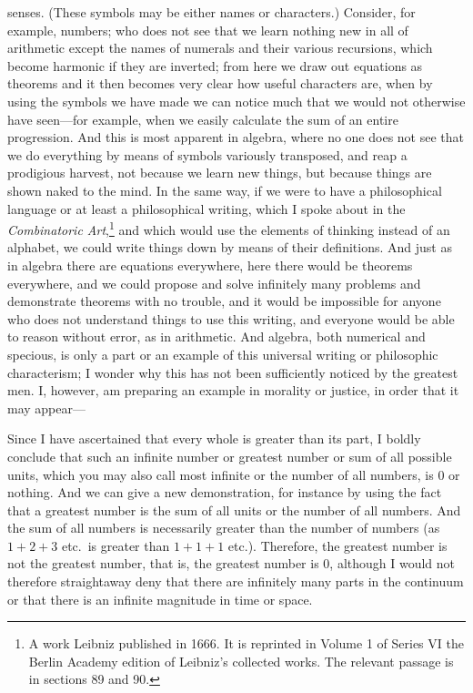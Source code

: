 \documentclass[polutonikogreek,english,twoside,openright]{article}
\begin{document}
senses. (These symbols may be either names or characters.) Consider, for
example, numbers; who does not see that we learn nothing new in all of
arithmetic except the names of numerals and their various recursions, which
become harmonic if they are inverted; from here we draw out equations as
theorems and it then becomes very clear how useful characters are, when by
using the symbols we have made we can notice much that we would not otherwise
have seen---for example, when we easily calculate the sum of an entire
progression.  And this is most apparent in algebra, where no one does not see
that we do everything by means of symbols variously transposed, and reap a
prodigious harvest, not because we learn new things, but because things are
shown naked to the mind.  In the same way, if we were to have a philosophical
language or at least a philosophical writing, which I spoke about in the {\em
Combinatoric Art},\footnote{A work Leibniz published in 1666.  It is reprinted in Volume 1 of Series VI the Berlin Academy edition of Leibniz's collected works.  The relevant passage is in sections 89 and 90. } and which would use the
elements of thinking instead of an alphabet, we could write things down by
means of their definitions.  And just as in algebra there are equations
everywhere, here there would be theorems everywhere, and we could propose and
solve infinitely many problems and demonstrate theorems with no trouble, and
it would be impossible for anyone who does not understand things to use this
writing, and everyone would be able to reason without error, as in arithmetic.
And algebra, both numerical and specious, is only a part or an example of this
universal writing or philosophic characterism; I wonder why this has not been
sufficiently noticed by the greatest men.  I, however, am preparing an example
in morality or justice, in order that it may appear---


Since I have ascertained that every whole is greater than its part, I boldly
conclude that such an infinite number or greatest number or sum of all
possible units, which you may also call most infinite or the number of all
numbers, is 0 or nothing.  And we can give a new demonstration, for instance
by using the fact that a greatest number is the sum of all units or the number
of all numbers.  And the sum of all numbers is necessarily greater than the
number of numbers (as $1+2+3$ etc.\ is greater than $1+1+1$ etc.).  Therefore,
the greatest number is not the greatest number, that is, the greatest number
is 0, although I would not therefore straightaway deny that there are
infinitely many parts in the continuum or that there is an infinite magnitude
in time or space.
\end{document}
